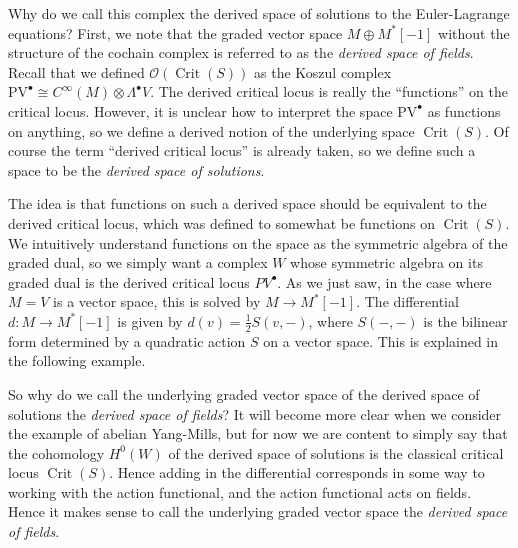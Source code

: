 \begin{discussion}\label{4.1.3}
	Why do we call this complex the derived space of solutions to the Euler-Lagrange equations? First, we note that the graded vector space $M\oplus M^*[-1]$ without the structure of the cochain complex is referred to as the \emph{derived space of fields}. Recall that we defined $\mathcal{O} (\operatorname{Crit} (S))$ as the Koszul complex $\mathrm{PV} ^{\bullet} \cong C^\infty (M) \otimes \Lambda^{\bullet} V$. The derived critical locus is really the ``functions'' on the critical locus. However, it is unclear how to interpret the space $\mathrm{PV} ^{\bullet} $ as functions on anything, so we define a derived notion of the underlying space $\operatorname{Crit} (S)$. Of course the term ``derived critical locus'' is already taken, so we define such a space to be the \emph{derived space of solutions}.

	The idea is that functions on such a derived space should be equivalent to the derived critical locus, which was defined to somewhat be functions on $\operatorname{Crit} (S)$. We intuitively understand functions on the space as the symmetric algebra of the graded dual, so we simply want a complex $W$ whose symmetric algebra on its graded dual is the derived critical locus $PV^{\bullet} $. As we just saw, in the case where $M=V$ is a vector space, this is solved by $M \to M^*[-1]$. The differential $d : M \to M^*[-1]$ is given by $d(v)=\frac{1}{2} S(v,-)$, where $S(-,-)$ is the bilinear form determined by a quadratic action $S$ on a vector space. This is explained in the following example.

	So why do we call the underlying graded vector space of the derived space of solutions the \emph{derived space of fields}? It will become more clear when we consider the example of abelian Yang-Mills, but for now we are content to simply say that the cohomology $H^0(W)$ of the derived space of solutions is the classical critical locus $\operatorname{Crit} (S)$. Hence adding in the differential corresponds in some way to working with the action functional, and the action functional acts on fields. Hence it makes sense to call the underlying graded vector space the \emph{derived space of fields}.
\end{discussion}

